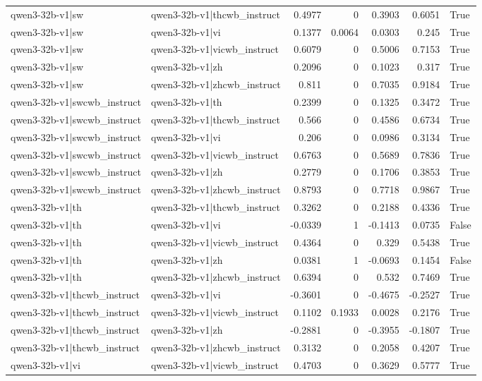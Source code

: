 \begin{table}
\begin{tabular}{l l r r r r l}
qwen3-32b-v1|sw & qwen3-32b-v1|thcwb_instruct & 0.4977 & 0 & 0.3903 & 0.6051 & True \\
qwen3-32b-v1|sw & qwen3-32b-v1|vi & 0.1377 & 0.0064 & 0.0303 & 0.245 & True \\
qwen3-32b-v1|sw & qwen3-32b-v1|vicwb_instruct & 0.6079 & 0 & 0.5006 & 0.7153 & True \\
qwen3-32b-v1|sw & qwen3-32b-v1|zh & 0.2096 & 0 & 0.1023 & 0.317 & True \\
qwen3-32b-v1|sw & qwen3-32b-v1|zhcwb_instruct & 0.811 & 0 & 0.7035 & 0.9184 & True \\
qwen3-32b-v1|swcwb_instruct & qwen3-32b-v1|th & 0.2399 & 0 & 0.1325 & 0.3472 & True \\
qwen3-32b-v1|swcwb_instruct & qwen3-32b-v1|thcwb_instruct & 0.566 & 0 & 0.4586 & 0.6734 & True \\
qwen3-32b-v1|swcwb_instruct & qwen3-32b-v1|vi & 0.206 & 0 & 0.0986 & 0.3134 & True \\
qwen3-32b-v1|swcwb_instruct & qwen3-32b-v1|vicwb_instruct & 0.6763 & 0 & 0.5689 & 0.7836 & True \\
qwen3-32b-v1|swcwb_instruct & qwen3-32b-v1|zh & 0.2779 & 0 & 0.1706 & 0.3853 & True \\
qwen3-32b-v1|swcwb_instruct & qwen3-32b-v1|zhcwb_instruct & 0.8793 & 0 & 0.7718 & 0.9867 & True \\
qwen3-32b-v1|th & qwen3-32b-v1|thcwb_instruct & 0.3262 & 0 & 0.2188 & 0.4336 & True \\
qwen3-32b-v1|th & qwen3-32b-v1|vi & -0.0339 & 1 & -0.1413 & 0.0735 & False \\
qwen3-32b-v1|th & qwen3-32b-v1|vicwb_instruct & 0.4364 & 0 & 0.329 & 0.5438 & True \\
qwen3-32b-v1|th & qwen3-32b-v1|zh & 0.0381 & 1 & -0.0693 & 0.1454 & False \\
qwen3-32b-v1|th & qwen3-32b-v1|zhcwb_instruct & 0.6394 & 0 & 0.532 & 0.7469 & True \\
qwen3-32b-v1|thcwb_instruct & qwen3-32b-v1|vi & -0.3601 & 0 & -0.4675 & -0.2527 & True \\
qwen3-32b-v1|thcwb_instruct & qwen3-32b-v1|vicwb_instruct & 0.1102 & 0.1933 & 0.0028 & 0.2176 & True \\
qwen3-32b-v1|thcwb_instruct & qwen3-32b-v1|zh & -0.2881 & 0 & -0.3955 & -0.1807 & True \\
qwen3-32b-v1|thcwb_instruct & qwen3-32b-v1|zhcwb_instruct & 0.3132 & 0 & 0.2058 & 0.4207 & True \\
qwen3-32b-v1|vi & qwen3-32b-v1|vicwb_instruct & 0.4703 & 0 & 0.3629 & 0.5777 & True \\

\end{tabular}
\end{table}
